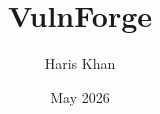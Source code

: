 

\usepackage{tabularray}      %
\usepackage{booktabs}        %
\usepackage{longtable}       %

\usepackage{mathtools}       %
\usepackage{pifont}          %
\usepackage{siunitx}         %
\usepackage{relsize}         %
\usepackage[version=4]{mhchem} %

\usepackage{float}           %
\usepackage{stfloats}        %
\usepackage{subcaption}      %
\usepackage{rotating}        %

\usepackage{algorithm}       %
\usepackage[noend]{algpseudocode}

\usepackage{lipsum}          %
\usepackage{enumitem}        %
\usepackage{verbatim}        %
\usepackage{afterpage}       %

\title{VulnForge}
\author{Haris Khan}
\date{May 2026}

